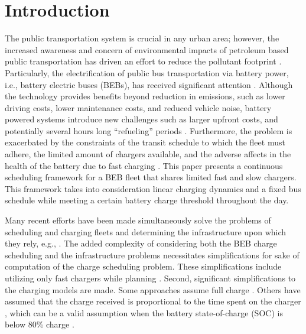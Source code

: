 \documentclass[utf8]{FrontiersinHarvard}
\let\cite\citep                                                                 %
\begin{document}
\section{Introduction}
\label{sec:introduction}
The public transportation system is crucial in any urban area; however, the increased awareness and concern of
environmental impacts of petroleum based public transportation has driven an effort to reduce the pollutant footprint
\cite{DeFilippo2014, Xylia2018, Guida2017, Li2016}. Particularly, the electrification of public bus transportation via
battery power, i.e., battery electric buses (BEBs), has received significant attention \cite{Li2016}. Although the
technology provides benefits beyond reduction in emissions, such as lower driving costs, lower maintenance costs, and
reduced vehicle noise, battery powered systems introduce new challenges such as larger upfront costs, and potentially
several hours long ``refueling'' periods \cite{Xylia2018, Li2016}. Furthermore, the problem is exacerbated by the
constraints of the transit schedule to which the fleet must adhere, the limited amount of chargers available, and the
adverse affects in the health of the battery due to fast charging \cite{Lutsey2019}. This paper presents a continuous
scheduling framework for a BEB fleet that shares limited fast and slow chargers. This framework takes into consideration
linear charging dynamics and a fixed bus schedule while meeting a certain battery charge threshold throughout the day.

Many recent efforts have been made simultaneously solve the problems of scheduling and charging fleets and determining
the infrastructure upon which they rely, e.g., \cite{Wei2018, Sebastiani2016, Hoke2014, Wang2017}. The added complexity
of considering both the BEB charge scheduling and the infrastructure problems necessitates simplifications for sake of
computation of the charge scheduling problem. These simplifications include utilizing only fast chargers while planning
\cite{Wei2018, Sebastiani2016, Wang2017, Zhou2020, Liu2020, Yang2018, Wang2017a, Qin2016}. Second, significant
simplifications to the charging models are made. Some approaches assume full charge \cite{Wei2018, Wang2017, Zhou2020,
  Wang2017a}. Others have assumed that the charge received is proportional to the time spent on the charger
\cite{Liu2020, Yang2018}, which can be a valid assumption when the battery state-of-charge (SOC) is below 80\% charge
\cite{Liu2020}.
\end{document}
